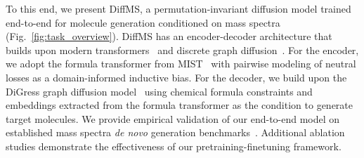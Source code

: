 \documentclass{article}
\theoremstyle{plain}
\theoremstyle{definition}
\theoremstyle{remark}
\newcommand{\ours}{DiffMS\xspace}
\begin{document}
To this end, we present \ours, a permutation-invariant diffusion model trained end-to-end for molecule generation conditioned on mass spectra (Fig.~\ref{fig:task_overview}).
\ours has an encoder-decoder architecture that builds upon modern transformers~\citep{vaswani2017attention} and discrete graph diffusion~\citep{vignac2023digress}. 
For the encoder, we adopt the formula transformer from MIST~\citep{goldman2023mist} with pairwise modeling of neutral losses as a domain-informed inductive bias. 
For the decoder, we build upon the DiGress graph diffusion model~\citep{vignac2023digress} using chemical formula constraints and embeddings extracted from the formula transformer as the condition to generate target molecules. 
We provide empirical validation of our end-to-end model on established mass spectra \emph{de novo} generation benchmarks~\citep{duhrkop2021canopus, bushuiev2024massspecgymbenchmarkdiscoveryidentification}. Additional ablation studies demonstrate the effectiveness of our pretraining-finetuning framework. 
\end{document}

